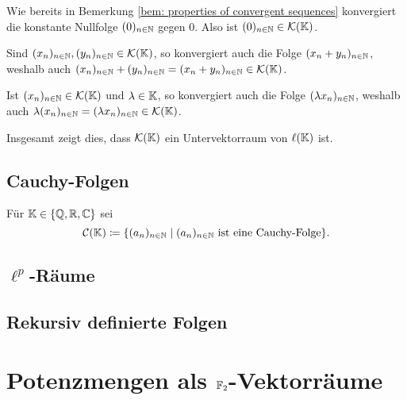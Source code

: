 Wie bereits in Bemerkung \ref{bem: properties of convergent sequences} konvergiert die konstante Nullfolge $(0)_{n \in \mathbb{N}}$ gegen $0$. Also ist $(0)_{n \in \mathbb{N}} \in \mathcal{K}(\mathbb{K})$.

Sind $(x_n)_{n \in \mathbb{N}}, (y_n)_{n \in \mathbb{N}} \in \mathcal{K}(\mathbb{K})$, so konvergiert auch die Folge $(x_n + y_n)_{n \in \mathbb{N}}$, weshalb auch $(x_n)_{n \in \mathbb{N}} + (y_n)_{n \in \mathbb{N}} = (x_n + y_n)_{n \in \mathbb{N}} \in \mathcal{K}(\mathbb{K})$.

Ist $(x_n)_{n \in \mathbb{N}} \in \mathcal{K}(\mathbb{K})$ und $\lambda \in \mathbb{K}$, so konvergiert auch die Folge $(\lambda x_n)_{n \in \mathbb{N}}$, weshalb auch $\lambda (x_n)_{n \in \mathbb{N}} = (\lambda x_n)_{n \in \mathbb{N}} \in \mathcal{K}(\mathbb{K})$.

Insgesamt zeigt dies, dass $\mathcal{K}(\mathbb{K})$ ein Untervektorraum von $\ell(\mathbb{K})$ ist.


\subsection{Cauchy-Folgen}
Für $\mathbb{K} \in \{\mathbb{Q}, \mathbb{R}, \mathbb{C}\}$ sei
\[
 \mathcal{C}(\mathbb{K})
 \coloneqq
 \{(a_n)_{n \in \mathbb{N}} \mid \text{$(a_n)_{n \in \mathbb{N}}$ ist eine Cauchy-Folge}\}.
\]


\subsection{\texorpdfstring{$\ell^p$}{lp}-Räume}


\subsection{}


\subsection{Rekursiv definierte Folgen}





\section{Potenzmengen als \texorpdfstring{$\mathbb{F}_2$}{F2}-Vektorräume}





